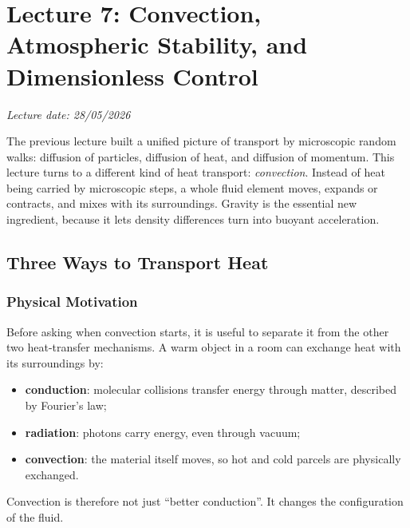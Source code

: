 \section{Lecture 7: Convection, Atmospheric Stability, and Dimensionless Control}
\label{sec:lec07}
\date{28/05/2026}

\begin{center}
    \textit{Lecture date: 28/05/2026}
\end{center}

The previous lecture built a unified picture of transport by microscopic
random walks: diffusion of particles, diffusion of heat, and diffusion of
momentum. This lecture turns to a different kind of heat transport:
\emph{convection}. Instead of heat being carried by microscopic steps, a whole
fluid element moves, expands or contracts, and mixes with its surroundings.
Gravity is the essential new ingredient, because it lets density differences
turn into buoyant acceleration.

\subsection{Three Ways to Transport Heat}
\label{sec:lec07:heat-transport-modes}

\subsubsection*{Physical Motivation}
Before asking when convection starts, it is useful to separate it from the
other two heat-transfer mechanisms. A warm object in a room can exchange heat
with its surroundings by:
\begin{itemize}
    \item \textbf{conduction}: molecular collisions transfer energy through
    matter, described by Fourier's law;
    \item \textbf{radiation}: photons carry energy, even through vacuum;
    \item \textbf{convection}: the material itself moves, so hot and cold
    parcels are physically exchanged.
\end{itemize}
Convection is therefore not just ``better conduction''. It changes the
configuration of the fluid.

